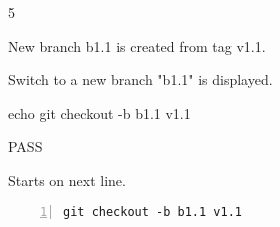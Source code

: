 \begin{description}[align=right,leftmargin=3.2cm,labelindent=3.0cm]
\item[Step:] 5
\item[Confirm:] New branch b1.1 is created from tag v1.1.
\item[Expectation:] Switch to a new branch "b1.1" is displayed.
\item[Command:] echo git  checkout -b b1.1 v1.1
\item[Test Result:] PASS
\item[Evidence:] Starts on next line.
\end{description}
\begin{lstlisting}[numbers=left]
git checkout -b b1.1 v1.1

\end{lstlisting}
